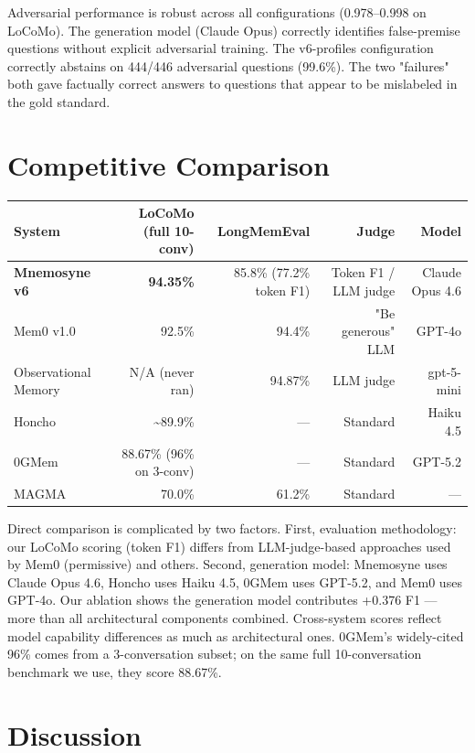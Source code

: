 \documentclass[11pt]{article}
\begin{document}
Adversarial performance is robust across all configurations (0.978--0.998 on LoCoMo). The generation model (Claude Opus) correctly identifies false-premise questions without explicit adversarial training. The v6-profiles configuration correctly abstains on 444/446 adversarial questions (99.6\%). The two "failures" both gave factually correct answers to questions that appear to be mislabeled in the gold standard.



\section{Competitive Comparison}


\begin{table}[htbp]
\centering
\small
\begin{tabular}{lrrrr}
\toprule
\textbf{System} & \textbf{LoCoMo (full 10-conv)} & \textbf{LongMemEval} & \textbf{Judge} & \textbf{Model} \\
\midrule
\textbf{Mnemosyne v6} & \textbf{94.35\%} & 85.8\% (77.2\% token F1) & Token F1 / LLM judge & Claude Opus 4.6 \\
Mem0 v1.0 & 92.5\% & 94.4\% & "Be generous" LLM & GPT-4o \\
Observational Memory & N/A (never ran) & 94.87\% & LLM judge & gpt-5-mini \\
Honcho & \textasciitilde 89.9\% & --- & Standard & Haiku 4.5 \\
0GMem & 88.67\% (96\% on 3-conv) & --- & Standard & GPT-5.2 \\
MAGMA & 70.0\% & 61.2\% & Standard & --- \\
\bottomrule
\end{tabular}
\end{table}

Direct comparison is complicated by two factors. First, evaluation methodology: our LoCoMo scoring (token F1) differs from LLM-judge-based approaches used by Mem0 (permissive) and others. Second, generation model: Mnemosyne uses Claude Opus 4.6, Honcho uses Haiku 4.5, 0GMem uses GPT-5.2, and Mem0 uses GPT-4o. Our ablation shows the generation model contributes +0.376 F1 --- more than all architectural components combined. Cross-system scores reflect model capability differences as much as architectural ones. 0GMem's widely-cited 96\% comes from a 3-conversation subset; on the same full 10-conversation benchmark we use, they score 88.67\%.



\section{Discussion}
\end{document}
